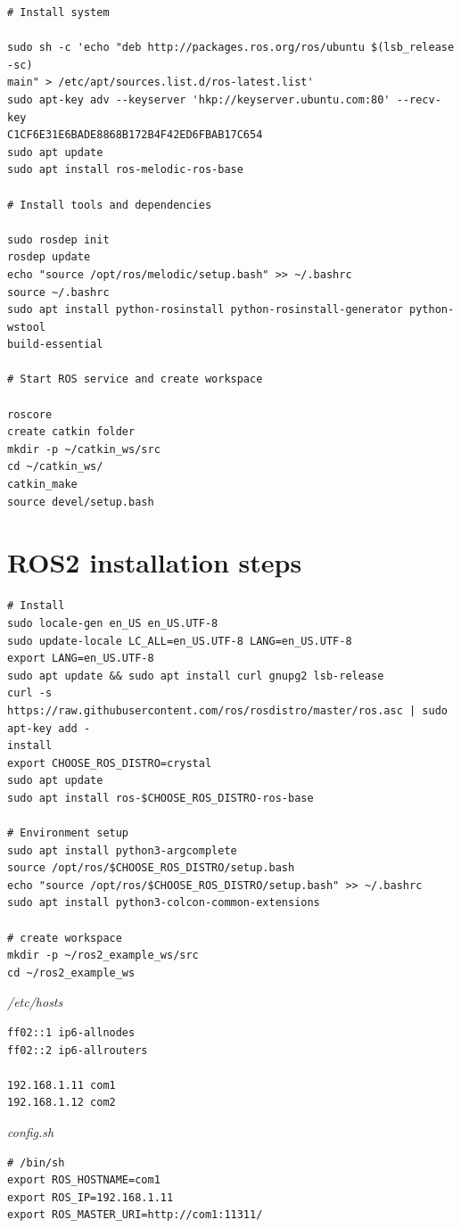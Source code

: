 \documentclass{mproj}
\begin{document}
\begin{verbatim}
# Install system

sudo sh -c 'echo "deb http://packages.ros.org/ros/ubuntu $(lsb_release -sc)
main" > /etc/apt/sources.list.d/ros-latest.list'
sudo apt-key adv --keyserver 'hkp://keyserver.ubuntu.com:80' --recv-key
C1CF6E31E6BADE8868B172B4F42ED6FBAB17C654
sudo apt update
sudo apt install ros-melodic-ros-base

# Install tools and dependencies

sudo rosdep init
rosdep update
echo "source /opt/ros/melodic/setup.bash" >> ~/.bashrc
source ~/.bashrc
sudo apt install python-rosinstall python-rosinstall-generator python-wstool 
build-essential

# Start ROS service and create workspace

roscore
create catkin folder
mkdir -p ~/catkin_ws/src
cd ~/catkin_ws/
catkin_make
source devel/setup.bash

\end{verbatim}

\section{ROS2 installation steps}

\begin{verbatim}
# Install 
sudo locale-gen en_US en_US.UTF-8
sudo update-locale LC_ALL=en_US.UTF-8 LANG=en_US.UTF-8
export LANG=en_US.UTF-8
sudo apt update && sudo apt install curl gnupg2 lsb-release
curl -s 
https://raw.githubusercontent.com/ros/rosdistro/master/ros.asc | sudo apt-key add -
install
export CHOOSE_ROS_DISTRO=crystal
sudo apt update
sudo apt install ros-$CHOOSE_ROS_DISTRO-ros-base

# Environment setup
sudo apt install python3-argcomplete
source /opt/ros/$CHOOSE_ROS_DISTRO/setup.bash
echo "source /opt/ros/$CHOOSE_ROS_DISTRO/setup.bash" >> ~/.bashrc
sudo apt install python3-colcon-common-extensions

# create workspace
mkdir -p ~/ros2_example_ws/src
cd ~/ros2_example_ws

\end{verbatim}
\textit{/etc/hosts}
\begin{verbatim}
ff02::1 ip6-allnodes
ff02::2 ip6-allrouters

192.168.1.11 com1
192.168.1.12 com2
\end{verbatim}
\textit{config.sh}
\begin{verbatim}
# /bin/sh
export ROS_HOSTNAME=com1
export ROS_IP=192.168.1.11
export ROS_MASTER_URI=http://com1:11311/
\end{verbatim}
\end{document}
